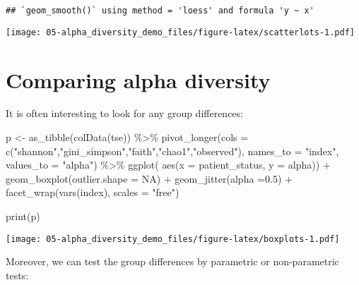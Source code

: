 \documentclass[
  oneside]{book}
\newenvironment{Shaded}{\begin{snugshade}}{\end{snugshade}}
\newcommand{\AttributeTok}[1]{\textcolor[rgb]{0.77,0.63,0.00}{#1}}
\newcommand{\ConstantTok}[1]{\textcolor[rgb]{0.00,0.00,0.00}{#1}}
\newcommand{\FloatTok}[1]{\textcolor[rgb]{0.00,0.00,0.81}{#1}}
\newcommand{\FunctionTok}[1]{\textcolor[rgb]{0.00,0.00,0.00}{#1}}
\newcommand{\NormalTok}[1]{#1}
\newcommand{\OtherTok}[1]{\textcolor[rgb]{0.56,0.35,0.01}{#1}}
\newcommand{\SpecialCharTok}[1]{\textcolor[rgb]{0.00,0.00,0.00}{#1}}
\newcommand{\StringTok}[1]{\textcolor[rgb]{0.31,0.60,0.02}{#1}}
\begin{document}
\begin{verbatim}
## `geom_smooth()` using method = 'loess' and formula 'y ~ x'
\end{verbatim}

\texttt{[image: 05-alpha\_diversity\_demo\_files/figure-latex/scatterlots-1.pdf]}

\hypertarget{comparing-alpha-diversity}{%
\section{Comparing alpha diversity}\label{comparing-alpha-diversity}}

It is often interesting to look for any group differences:

\begin{Shaded}
\begin{Highlighting}[]
\NormalTok{p }\OtherTok{\textless{}{-}} \FunctionTok{as\_tibble}\NormalTok{(}\FunctionTok{colData}\NormalTok{(tse)) }\SpecialCharTok{\%\textgreater{}\%} 
  \FunctionTok{pivot\_longer}\NormalTok{(}\AttributeTok{cols =} \FunctionTok{c}\NormalTok{(}\StringTok{"shannon"}\NormalTok{,}\StringTok{"gini\_simpson"}\NormalTok{,}\StringTok{"faith"}\NormalTok{,}\StringTok{"chao1"}\NormalTok{,}\StringTok{"observed"}\NormalTok{), }\AttributeTok{names\_to =} \StringTok{"index"}\NormalTok{, }\AttributeTok{values\_to =} \StringTok{"alpha"}\NormalTok{) }\SpecialCharTok{\%\textgreater{}\%} 
  \FunctionTok{ggplot}\NormalTok{( }\FunctionTok{aes}\NormalTok{(}\AttributeTok{x =}\NormalTok{ patient\_status, }\AttributeTok{y =}\NormalTok{ alpha)) }\SpecialCharTok{+} 
  \FunctionTok{geom\_boxplot}\NormalTok{(}\AttributeTok{outlier.shape =} \ConstantTok{NA}\NormalTok{) }\SpecialCharTok{+}
  \FunctionTok{geom\_jitter}\NormalTok{(}\AttributeTok{alpha =}\FloatTok{0.5}\NormalTok{) }\SpecialCharTok{+}
  \FunctionTok{facet\_wrap}\NormalTok{(}\FunctionTok{vars}\NormalTok{(index), }\AttributeTok{scales =} \StringTok{"free"}\NormalTok{)}

\FunctionTok{print}\NormalTok{(p)}
\end{Highlighting}
\end{Shaded}

\texttt{[image: 05-alpha\_diversity\_demo\_files/figure-latex/boxplots-1.pdf]}

Moreover, we can test the group differences by parametric or non-parametric tests:
\end{document}
